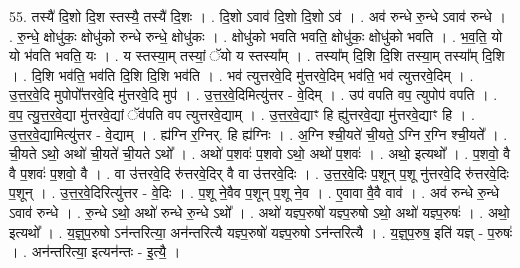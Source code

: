 \documentclass[17pt]{extarticle}
\begin{document}
55. तस्यै॑ दि॒शो दि॒श स्तस्यै॒ तस्यै॑ दि॒शः । . दि॒शो ऽवाव॑ दि॒शो दि॒शो ऽव॑ । . अव॑ रुन्धे रु॒न्धे ऽवाव॑ रुन्धे । . रु॒न्धे॒ क्षोधु॑कः॒ क्षोधु॑को रुन्धे रुन्धे॒ क्षोधु॑कः । . क्षोधु॑को भवति भवति॒ क्षोधु॑कः॒ क्षोधु॑को भवति । . भ॒व॒ति॒ यो यो भ॑वति भवति॒ यः । . य स्तस्या॒म् तस्यां॒ ॅयो य स्तस्या᳚म् । . तस्या᳚म् दि॒शि दि॒शि तस्या॒म् तस्या᳚म् दि॒शि । . दि॒शि भव॑ति॒ भव॑ति दि॒शि दि॒शि भव॑ति । . भव॑ त्युत्तरवे॒दि मु॑त्तरवे॒दिम् भव॑ति॒ भव॑ त्युत्तरवे॒दिम् । . उ॒त्त॒र॒वे॒दि मुपोपो᳚त्तरवे॒दि मु॑त्तरवे॒दि मुप॑ । . उ॒त्त॒र॒वे॒दिमित्यु॑त्तर - वे॒दिम् । . उप॑ वपति वप॒ त्युपोप॑ वपति । . व॒प॒ त्यु॒त्त॒र॒वे॒द्या मु॑त्तरवे॒द्यां ॅव॑पति वप त्युत्तरवे॒द्याम् । . उ॒त्त॒र॒वे॒द्याꣳ हि ह्यु॑त्तरवे॒द्या मु॑त्तरवे॒द्याꣳ हि । . उ॒त्त॒र॒वे॒द्यामित्यु॑त्तर - वे॒द्याम् । . ह्य॑ग्नि र॒ग्निर्. हि ह्य॑ग्निः । . अ॒ग्नि श्ची॒यते॑ ची॒यते॒ ऽग्नि र॒ग्नि श्ची॒यते᳚ । . ची॒यते ऽथो॒ अथो॑ ची॒यते॑ ची॒यते ऽथो᳚ । . अथो॑ प॒शवः॑ प॒शवो ऽथो॒ अथो॑ प॒शवः॑ । . अथो॒ इत्यथो᳚ । . प॒शवो॒ वै वै प॒शवः॑ प॒शवो॒ वै । . वा उ॑त्तरवे॒दि रु॑त्तरवे॒दिर् वै वा उ॑त्तरवे॒दिः । . उ॒त्त॒र॒वे॒दिः प॒शून् प॒शू नु॑त्तरवे॒दि रु॑त्तरवे॒दिः प॒शून् । . उ॒त्त॒र॒वे॒दिरित्यु॑त्तर - वे॒दिः । . प॒शू ने॒वैव प॒शून् प॒शू ने॒व । . ए॒वावा वै॒वै वाव॑ । . अव॑ रुन्धे रु॒न्धे ऽवाव॑ रुन्धे । . रु॒न्धे ऽथो॒ अथो॑ रुन्धे रु॒न्धे ऽथो᳚ । . अथो॑ यज्ञ्प॒रुषो॑ यज्ञ्प॒रुषो ऽथो॒ अथो॑ यज्ञ्प॒रुषः॑ । . अथो॒ इत्यथो᳚ । . य॒ज्ञ्॒प॒रुषो ऽन॑न्तरित्या॒ अन॑न्तरित्यै यज्ञ्प॒रुषो॑ यज्ञ्प॒रुषो ऽन॑न्तरित्यै । . य॒ज्ञ्॒प॒रुष॒ इति॑ यज्ञ् - प॒रुषः॑ । . अन॑न्तरित्या॒ इत्यन॑न्तः - इ॒त्यै॒ । \newline
\end{document}

